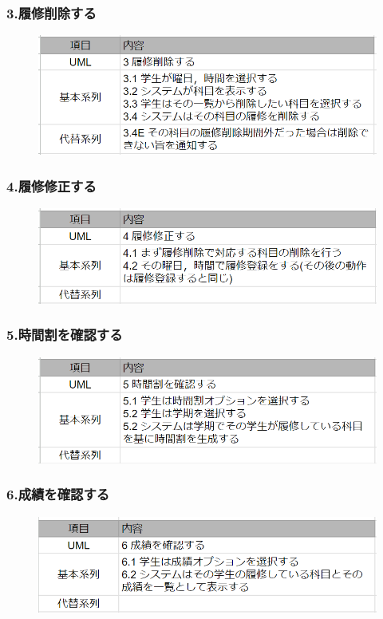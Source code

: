 \documentclass[documentclass]{jsarticle}
\begin{document}
\subsubsection*{3.履修削除する}
\begin{figure}[H]
  \includegraphics*[scale=0.4]{figure/4-3.png}
\end{figure}

\subsubsection*{4.履修修正する}
\begin{figure}[H]
  \includegraphics*[scale=0.4]{figure/4-4.png}
\end{figure}

\subsubsection*{5.時間割を確認する}
\begin{figure}[H]
  \includegraphics*[scale=0.4]{figure/4-5.png}
\end{figure}

\subsubsection*{6.成績を確認する}
\begin{figure}[H]
  \includegraphics*[scale=0.4]{figure/4-6.png}
\end{figure}
\end{document}
